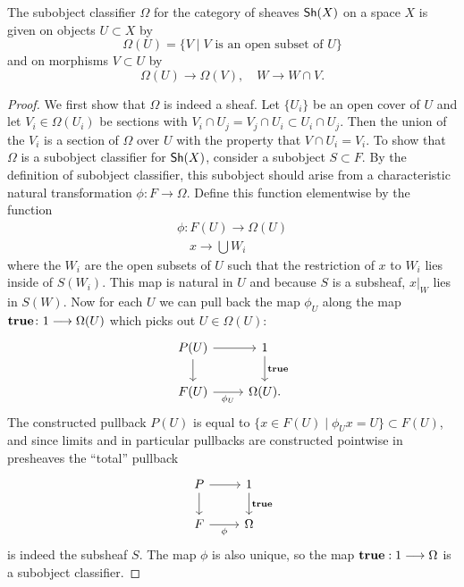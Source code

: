 \begin{proposition}\label{prop:classifier}
	The subobject classifier $\Omega$ for the category of sheaves $\operatorname{\mathsf{Sh}}(X)$ on a space $X$ is given on objects $U \subset X$ by
	\[
		\Omega(U) = \{ V \mid V \text{ is an open subset of } U \}
	\]
	and on morphisms $V \subset U$ by
	\[
		\Omega(U) \to \Omega(V),\quad W \to W \cap V.
	\]
\end{proposition}

\begin{proof}
	We first show that $\Omega$ is indeed a sheaf. Let $\{U_i\}$ be an open cover of $U$ and let $V_i \in \Omega(U_i)$ be sections with $V_i \cap U_j = V_j \cap U_i \subset U_i \cap U_j$. Then the union of the $V_i$ is a section of $\Omega$ over $U$ with the property that $V \cap U_i = V_i$. To show that $\Omega$ is a subobject classifier for $\operatorname{\mathsf{Sh}}(X)$, consider a subobject $S \subset F$. By the definition of subobject classifier, this subobject should arise from a characteristic natural transformation $\phi \colon F \to \Omega$. Define this function elementwise by the function
	\begin{gather*}
		\phi \colon F(U) \to \Omega(U)\\
		\quad x \to \bigcup W_i
	\end{gather*}
	where the $W_i$ are the open subsets of $U$ such that the restriction of $x$ to $W_i$ lies inside of $S(W_i)$. This map is natural in $U$ and because $S$ is a subsheaf, $x|_W$ lies in $S(W)$. Now for each $U$  we can pull back the map $\phi_U$ along the map $\mathbf{true} \colon 1 \longrightarrow \Omega(U)$ which picks out $U \in \Omega(U)$:
	\[
		\begin{tikzcd}
			P(U) & 1 \\
			F(U) & \Omega(U)
			\arrow[from=1-1, to=2-1]
			\arrow[from=1-1, to=1-2]
			\arrow["\true", from=1-2, to=2-2]
			\arrow["\phi_U"', from=2-1, to=2-2].
		\end{tikzcd}
	\]
	The constructed pullback $P(U)$ is equal to $\{x \in F(U) \mid \phi_U x = U\} \subset F(U)$, and since limits and in particular pullbacks are constructed pointwise in presheaves the ``total'' pullback
	\[
		\begin{tikzcd}
			P & 1 \\
			F & \Omega
			\arrow[from=1-1, to=2-1]
			\arrow[from=1-1, to=1-2]
			\arrow["{\true}", from=1-2, to=2-2]
			\arrow["\phi"', from=2-1, to=2-2]
		\end{tikzcd}
	\]
	is indeed the subsheaf $S$. The map $\phi$ is also unique, so the map $\mathbf{true}: 1 \longrightarrow \Omega$ is a subobject classifier.
\end{proof}
